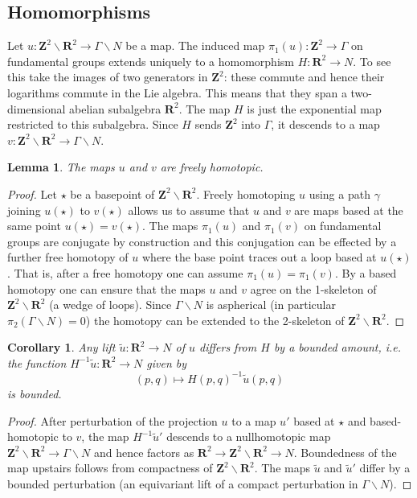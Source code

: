 \documentclass[11pt]{amsart}
\newcommand{\RR}{\mathbf{R}}
\newcommand{\ZZ}{\mathbf{Z}}
\newcommand{\torus}{\ZZ^2\backslash\RR^2}
\newcommand{\nilman}{\Gamma\backslash N}
\numberwithin{equation}{section}
\newtheorem{lma}[equation]{Lemma}
\newtheorem{cor}[equation]{Corollary}
\theoremstyle{definition}
\theoremstyle{remark}
\begin{document}

\subsection{Homomorphisms}

Let $u\colon\torus\to\nilman$ be a map. The induced map $\pi_1(u)\colon\ZZ^2\to\Gamma$ on fundamental groups extends uniquely to a homomorphism $H\colon\RR^2\to N$. To see this take the images of two generators in $\ZZ^2$: these commute and hence their logarithms commute in the Lie algebra. This means that they span a two-dimensional abelian subalgebra $\RR^2$. The map $H$ is just the exponential map restricted to this subalgebra. Since $H$ sends $\ZZ^2$ into $\Gamma$, it descends to a map $v\colon\torus\to\nilman$.

\begin{lma}
The maps $u$ and $v$ are freely homotopic.
\end{lma}

\begin{proof}
Let $\star$ be a basepoint of $\ZZ^2\backslash\RR^2$. Freely homotoping $u$ using a path $\gamma$ joining $u(\star)$ to $v(\star)$ allows us to assume that $u$ and $v$ are maps based at the same point $u(\star)=v(\star)$. The maps $\pi_1(u)$ and $\pi_1(v)$ on fundamental groups are conjugate by construction and this conjugation can be effected by a further free homotopy of $u$ where the base point traces out a loop based at $u(\star)$. That is, after a free homotopy one can assume $\pi_1(u)=\pi_1(v)$. By a based homotopy one can ensure that the maps $u$ and $v$ agree on the 1-skeleton of $\ZZ^2\backslash\RR^2$ (a wedge of loops). Since $\Gamma\backslash N$ is aspherical (in particular $\pi_2(\Gamma\backslash N)=0$) the homotopy can be extended to the 2-skeleton of $\ZZ^2\backslash\RR^2$.
\end{proof}

\begin{cor}\label{bdd}
Any lift $\tilde{u}\colon\RR^2\to N$ of $u$ differs from $H$ by a bounded amount, i.e. the function $H^{-1}\tilde{u}\colon\RR^2\to N$ given by
\[(p,q)\mapsto H(p,q)^{-1}\tilde{u}(p,q)\]
is bounded.
\end{cor}

\begin{proof}
After perturbation of the projection $u$ to a map $u'$ based at $\star$ and based-homotopic to $v$, the map $H^{-1}\tilde{u}'$ descends to a nullhomotopic map $\torus\to\nilman$ and hence factors as $\RR^2\to\torus\to N$. Boundedness of the map upstairs follows from compactness of $\torus$. The maps $\tilde{u}$ and $\tilde{u}'$ differ by a bounded perturbation (an equivariant lift of a compact perturbation in $\nilman$).
\end{proof}
\end{document}
